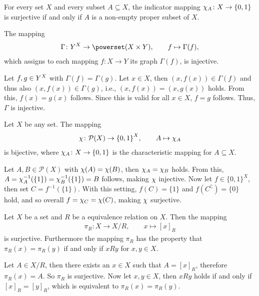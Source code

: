 \begin{examples}
\begin{exampleenumerate}
\begin{miniproof}
        \end{miniproof}
        \item For every set $X$ and every subset $A\subseteq X$, the indicator mapping $\charmap_A\colon X\rightarrow \{0,1\}$ is surjective if and only if $A$ is a non-empty proper subset of $X$.
        \item The mapping
        \begin{align}\Gamma\colon \mapset X Y\rightarrow \powerset(X\times Y),\qquad f\mapsto \Gamma(f),\end{align}
        which assigns to each mapping $f\colon X\rightarrow Y$ its graph $\Gamma(f)$, is injective.
        \begin{miniproof}
        Let $f,g\in \mapset X Y$ with $\Gamma(f)=\Gamma(g)$. Let $x\in X$, then $(x,f(x))\in\Gamma(f)$ and thus also $(x,f(x))\in\Gamma(g)$, i.e., $(x,f(x))=(x,g(x))$ holds. From this, $f(x)=g(x)$ follows. Since this is valid for all $x\in X$, $f=g$ follows. Thus, $\Gamma$ is injective.
        \end{miniproof}
        \item\label{example:mappings:powerset_characteristic_bijective} Let $X$ be any set. The mapping \begin{align}\charmap\colon \mathcal{P}(X)\rightarrow\mapset X {\{0,1\}},\qquad A\mapsto\charmap_A\end{align}
        is bijective, where $\charmap_A\colon X\rightarrow\{0,1\}$ is the characteristic mapping for $A\subseteq X$.
        \begin{miniproof}
        Let $A,B\in\mathcal{P}(X)$ with $\charmap(A)=\charmap(B)$, then $\charmap_A=\charmap_B$ holds. From this, $A=\charmap_A^{-1}(\{1\})=\charmap_B^{-1}(\{1\})=B$ follows, making $\charmap$ injective. Now let $f\in\{0,1\}^X$, then set $C=f^{-1}(\{1\})$. With this setting, $f(C)=\{1\}$ and $f(C^\complement)=\{0\}$ hold, and so overall $f=\charmap_C=\charmap(C)$, making $\charmap$ surjective.
        \end{miniproof}
        \item\label{example:mappings:surjection_quotient} Let $X$ be a set and $R$ be a equivalence relation on $X$. Then the mapping \begin{align}\pi_R\colon X\rightarrow X/R,\qquad x\mapsto[x]_R\end{align}
        is surjective. Furthermore the mapping $\pi_R$ has the property that $\pi_R(x)=\pi_R(y)$ if and only if $xRy$ for $x,y\in X$.
        \begin{miniproof}
            Let $A\in X/R$, then there exists an $x\in X$ such that $A=[x]_R$, therefore $\pi_R(x)=A$. So $\pi_R$ is surjective. Now let $x,y\in X$, then $xRy$ holds if and only if $[x]_R=[y]_R$, which is equivalent to $\pi_R(x)=\pi_R(y)$.

\end{miniproof}
\end{exampleenumerate}
\end{examples}

